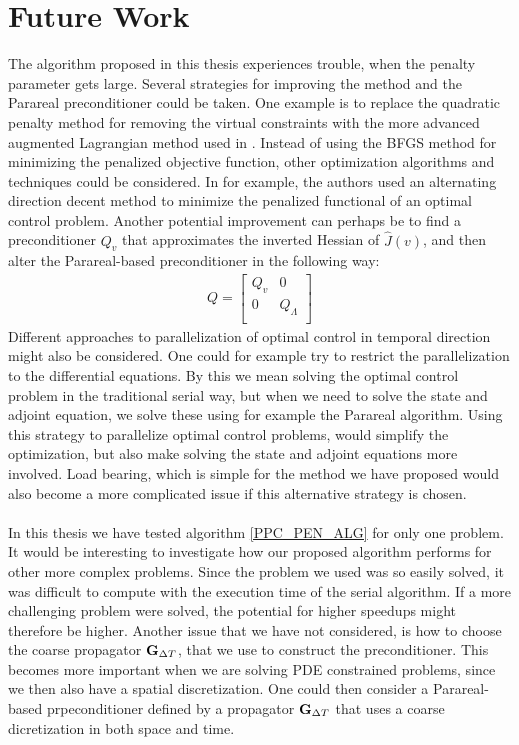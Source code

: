 \section{Future Work}
The algorithm proposed in this thesis experiences trouble, when the penalty parameter gets large. Several strategies for improving the method and the Parareal preconditioner could be taken. One example is to replace the quadratic penalty method for removing the virtual constraints with the more advanced augmented Lagrangian method used in \cite{rao2016time}. Instead of using the BFGS method for minimizing the penalized objective function, other optimization algorithms and techniques could be considered. In \cite{maday2003parallel, maday2007monotonic} for example, the authors used an alternating direction decent method to minimize the penalized functional of an optimal control problem. Another potential improvement can perhaps be to find a preconditioner $Q_v$ that approximates the inverted Hessian of $\hat J(v)$, and then alter the Parareal-based preconditioner in the following way:
\begin{align*}
Q = \left[ \begin{array}{cc}
	Q_v & 0 \\
	0 & Q_{\Lambda} \\
	\end{array} \right]
\end{align*}
Different approaches to parallelization of optimal control in temporal direction might also be considered. One could for example try to restrict the parallelization to the differential equations. By this we mean solving the optimal control problem in the traditional serial way, but when we need to solve the state and adjoint equation, we solve these using for example the Parareal algorithm. Using this strategy to parallelize optimal control problems, would simplify the optimization, but also make solving the state and adjoint equations more involved. Load bearing, which is simple for the method we have proposed would also become a more complicated issue if this alternative strategy is chosen.
\\
\\
In this thesis we have tested algorithm \ref{PPC_PEN_ALG} for only one problem. It would be interesting to investigate how our proposed algorithm performs for other more complex problems. Since the problem we used was so easily solved, it was difficult to compute with the execution time of the serial algorithm. If a more challenging problem were solved, the potential for higher speedups might therefore be higher. Another issue that we have not considered, is how to choose the coarse propagator $\bold G_{\Delta T}$, that we use to construct the preconditioner. This becomes more important when we are solving PDE constrained problems, since we then also have a spatial discretization. One could then consider a Parareal-based prpeconditioner defined by a propagator $\bold G_{\Delta T}$  that uses a coarse dicretization in both space and time.



